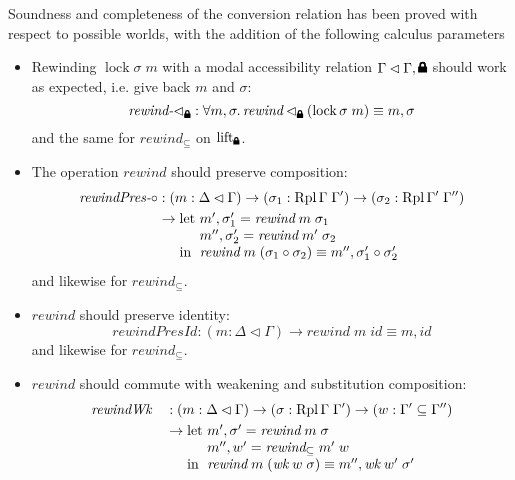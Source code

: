 \documentclass{article}
\theoremstyle{definition}\newtheorem{definition}{Definition}
\newcommand{\lock}{\text{\tikz[baseline]{
      \fill[rounded corners=.1ex] (-.75ex,0) rectangle (.75ex,1ex);
      \draw[line width=.3ex] (-.4ex,.5ex) -- ++(0,.75ex) arc (180:0:.4ex) -- ++(0,-.75ex);
}}}
\begin{document}
Soundness and completeness of the conversion relation
has been proved with respect to possible worlds,
with the addition of the following calculus parameters
\begin{itemize}
\item Rewinding $\operatorname{lock} \sigma \; m$
  with a modal accessibility relation $\Gamma \lhd \Gamma, \lock$
  should work as expected, i.e. give back $m$ and $\sigma$:
  $$ \textit{rewind-$\lhd_\lock$} : \forall m, \sigma. \, \textit{rewind} \lhd_\lock (\operatorname{lock} \sigma \; m) \equiv m , \sigma $$
  and the same for $\textit{rewind}_\subseteq$ on $\operatorname{lift_\lock}$.
\item The operation $\textit{rewind}$ should preserve composition:
  \begin{align*}
    \textit{rewindPres-$\circ$} &: (m : \Delta\lhd\Gamma) \to (\sigma_1 : \operatorname{Rpl} \Gamma \; \Gamma') \to (\sigma_2 : \operatorname{Rpl} \Gamma' \; \Gamma'') \\
    &\to
    \begin{array}[t]{@{}l@{}l@{}}
      \text{let } & m' , \sigma_1' = \textit{rewind} \; m \; \sigma_1 \\
      & m'' , \sigma_2' = \textit{rewind} \; m' \; \sigma_2 \\
      \text{in } & \textit{rewind} \; m \; (\sigma_1 \circ \sigma_2) \equiv m'' , \sigma_1' \circ \sigma_2'
    \end{array}
  \end{align*}
  and likewise for $\textit{rewind}_\subseteq$.
\item $\textit{rewind}$ should preserve identity:
  $$ \textit{rewindPresId} : (m : \Delta\lhd\Gamma) \to \textit{rewind} \; m \; \textit{id} \equiv m , \textit{id} $$
  and likewise for $\textit{rewind}_\subseteq$.
\item $\textit{rewind}$ should commute with weakening and substitution composition:
  \begin{align*}
    &\textit{rewindWk} &&: (m : \Delta\lhd\Gamma) \to (\sigma : \operatorname{Rpl} \Gamma \; \Gamma') \to (w : \Gamma' \subseteq \Gamma'') \\
    &&&\to
    \begin{array}[t]{@{}l@{}l@{}}
      \text{let } & m' , \sigma' = \textit{rewind} \; m \; \sigma \\
      & m'' , w' = \textit{rewind}_\subseteq \; m' \; w \\
      \text{in } & \textit{rewind} \; m \; (\textit{wk} \; w \; \sigma) \equiv m'' , \textit{wk} \; w' \; \sigma'

\end{array}
\end{align*}
\end{itemize}
\end{document}
